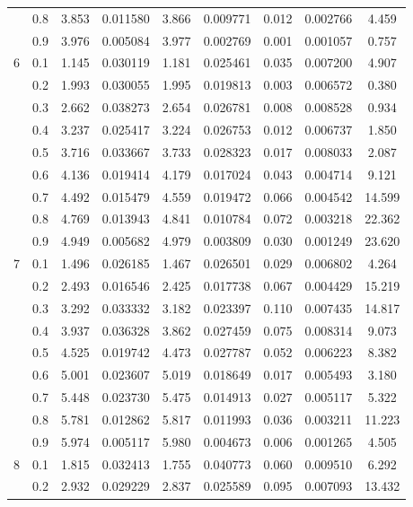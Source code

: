 \begin{longtable}{ | c | c || c | c | c | c | c | c | c | }
 & 0.8 & 3.853 & 0.011580 & 3.866 & 0.009771 & 0.012 & 0.002766 & 4.459 \\
 & 0.9 & 3.976 & 0.005084 & 3.977 & 0.002769 & 0.001 & 0.001057 & 0.757 \\
 \hline
\multirow{9}{*}{6} & 0.1 & 1.145 & 0.030119 & 1.181 & 0.025461 & 0.035 & 0.007200 & 4.907 \\
 & 0.2 & 1.993 & 0.030055 & 1.995 & 0.019813 & 0.003 & 0.006572 & 0.380 \\
 & 0.3 & 2.662 & 0.038273 & 2.654 & 0.026781 & 0.008 & 0.008528 & 0.934 \\
 & 0.4 & 3.237 & 0.025417 & 3.224 & 0.026753 & 0.012 & 0.006737 & 1.850 \\
 & 0.5 & 3.716 & 0.033667 & 3.733 & 0.028323 & 0.017 & 0.008033 & 2.087 \\
 & 0.6 & 4.136 & 0.019414 & 4.179 & 0.017024 & 0.043 & 0.004714 & 9.121 \\
 & 0.7 & 4.492 & 0.015479 & 4.559 & 0.019472 & 0.066 & 0.004542 & 14.599 \\
 & 0.8 & 4.769 & 0.013943 & 4.841 & 0.010784 & 0.072 & 0.003218 & 22.362 \\
 & 0.9 & 4.949 & 0.005682 & 4.979 & 0.003809 & 0.030 & 0.001249 & 23.620 \\
 \hline
\multirow{9}{*}{7} & 0.1 & 1.496 & 0.026185 & 1.467 & 0.026501 & 0.029 & 0.006802 & 4.264 \\
 & 0.2 & 2.493 & 0.016546 & 2.425 & 0.017738 & 0.067 & 0.004429 & 15.219 \\
 & 0.3 & 3.292 & 0.033332 & 3.182 & 0.023397 & 0.110 & 0.007435 & 14.817 \\
 & 0.4 & 3.937 & 0.036328 & 3.862 & 0.027459 & 0.075 & 0.008314 & 9.073 \\
 & 0.5 & 4.525 & 0.019742 & 4.473 & 0.027787 & 0.052 & 0.006223 & 8.382 \\
 & 0.6 & 5.001 & 0.023607 & 5.019 & 0.018649 & 0.017 & 0.005493 & 3.180 \\
 & 0.7 & 5.448 & 0.023730 & 5.475 & 0.014913 & 0.027 & 0.005117 & 5.322 \\
 & 0.8 & 5.781 & 0.012862 & 5.817 & 0.011993 & 0.036 & 0.003211 & 11.223 \\
 & 0.9 & 5.974 & 0.005117 & 5.980 & 0.004673 & 0.006 & 0.001265 & 4.505 \\
 \hline
\multirow{9}{*}{8} & 0.1 & 1.815 & 0.032413 & 1.755 & 0.040773 & 0.060 & 0.009510 & 6.292 \\
 & 0.2 & 2.932 & 0.029229 & 2.837 & 0.025589 & 0.095 & 0.007093 & 13.432 \\

\end{longtable}
